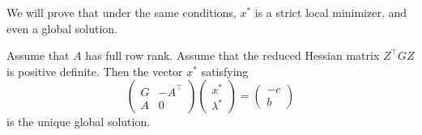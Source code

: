 We will prove that under the same conditions, $x^*$ is a strict local minimizer, and even a global solution.

\begin{theoreme}
    Assume that $A$ has full row rank. Assume that the reduced Hessian matrix $Z^\top G Z$ is positive definite.
    Then the vector $x^*$ satisfying
    \begin{equation}
        \begin{pmatrix}
            G & -A^\top \\
            A & 0
        \end{pmatrix}
        \begin{pmatrix}
            x^* \\
            \lambda^*
        \end{pmatrix}
        =
        \begin{pmatrix}
            -c \\
            b
        \end{pmatrix}
    \end{equation}
    is the unique global solution.
\end{theoreme}


